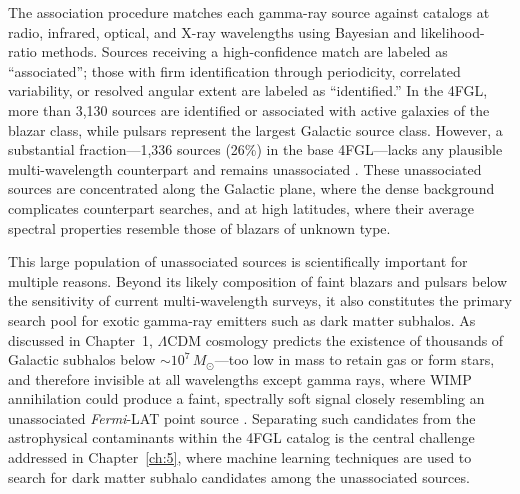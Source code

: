 The association procedure matches each gamma-ray source against catalogs at radio, infrared, optical, and X-ray wavelengths using Bayesian and likelihood-ratio methods.
Sources receiving a high-confidence match are labeled as ``associated''; those with firm identification through periodicity, correlated variability, or resolved angular extent are labeled as ``identified.'' In the 4FGL, more than 3,130 sources are identified or associated with active galaxies of the blazar class, while pulsars represent the largest Galactic source class.
However, a substantial fraction---1,336 sources (26\%) in the base 4FGL---lacks any plausible multi-wavelength counterpart and remains unassociated \cite{Fermi-LAT:2019yla}.
These unassociated sources are concentrated along the Galactic plane, where the dense background complicates counterpart searches, and at high latitudes, where their average spectral properties resemble those of blazars of unknown type.

This large population of unassociated sources is scientifically important for multiple reasons.
Beyond its likely composition of faint blazars and pulsars below the sensitivity of current multi-wavelength surveys, it also constitutes the primary search pool for exotic gamma-ray emitters such as dark matter subhalos.
As discussed in Chapter~1, $\Lambda$CDM cosmology predicts the existence of thousands of Galactic subhalos below $\sim 10^7\,M_\odot$---too low in mass to retain gas or form stars, and therefore invisible at all wavelengths except gamma rays, where WIMP annihilation could produce a faint, spectrally soft signal closely resembling an unassociated \textit{Fermi}-LAT point source \cite{Cirelli:2024ssz, Springel:2008cc}. Separating such candidates from the astrophysical contaminants within the 4FGL catalog is the central challenge addressed in Chapter~\ref{ch:5}, where machine learning techniques are used to search for dark matter subhalo candidates among the unassociated sources.
